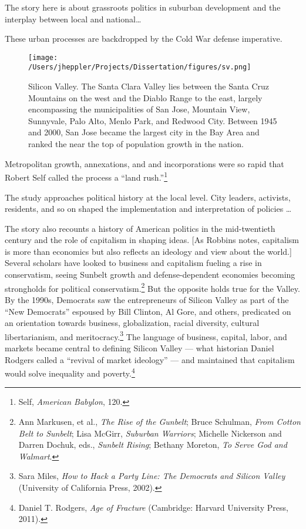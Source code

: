 \documentclass[11pt,article,oneside]{memoir}
\makeatletter
\def\maxwidth{\ifdim\Gin@nat@width>\linewidth\linewidth
\else\Gin@nat@width\fi}
\let\Oldincludegraphics\includegraphics
\renewcommand{\includegraphics}[1]{\Oldincludegraphics[width=\maxwidth]{#1}}
\makeatother
\begin{document}
The story here is about grassroots politics in suburban development and
the interplay between local and national\ldots{}

These urban processes are backdropped by the Cold War defense
imperative.

\begin{figure}[htbp]
\centering
\texttt{[image: /Users/jheppler/Projects/Dissertation/figures/sv.png]}
\caption{Silicon Valley. The Santa Clara Valley lies between the Santa
Cruz Mountains on the west and the Diablo Range to the east, largely
encompassing the municipalities of San Jose, Mountain View, Sunnyvale,
Palo Alto, Menlo Park, and Redwood City. Between 1945 and 2000, San Jose
became the largest city in the Bay Area and ranked the near the top of
population growth in the nation.}
\end{figure}

Metropolitan growth, annexations, and and incorporations were so rapid
that Robert Self called the process a ``land rush.''\footnote{Self,
  \emph{American Babylon}, 120.}

The study approaches political history at the local level. City leaders,
activists, residents, and so on shaped the implementation and
interpretation of policies \ldots{}

The story also recounts a history of American politics in the
mid-twentieth century and the role of capitalism in shaping ideas. {[}As
Robbins notes, capitalism is more than economics but also reflects an
ideology and view about the world.{]} Several scholars have looked to
business and capitalism fueling a rise in conservatism, seeing Sunbelt
growth and defense-dependent economies becoming strongholds for
political conservatism.\footnote{Ann Markusen, et al., \emph{The Rise of
  the Gunbelt}; Bruce Schulman, \emph{From Cotton Belt to Sunbelt}; Lisa
  McGirr, \emph{Suburban Warriors}; Michelle Nickerson and Darren
  Dochuk, eds., \emph{Sunbelt Rising}; Bethany Moreton, \emph{To Serve
  God and Walmart}.} But the opposite holds true for the Valley. By the
1990s, Democrats saw the entrepreneurs of Silicon Valley as part of the
``New Democrats'' espoused by Bill Clinton, Al Gore, and others,
predicated on an orientation towards business, globalization, racial
diversity, cultural libertarianism, and meritocracy.\footnote{Sara
  Miles, \emph{How to Hack a Party Line: The Democrats and Silicon
  Valley} (University of California Press, 2002).} The language of
business, capital, labor, and markets became central to defining Silicon
Valley --- what historian Daniel Rodgers called a ``revival of market
ideology'' --- and maintained that capitalism would solve inequality and
poverty.\footnote{Daniel T. Rodgers, \emph{Age of Fracture} (Cambridge:
  Harvard University Press, 2011).}
\end{document}
